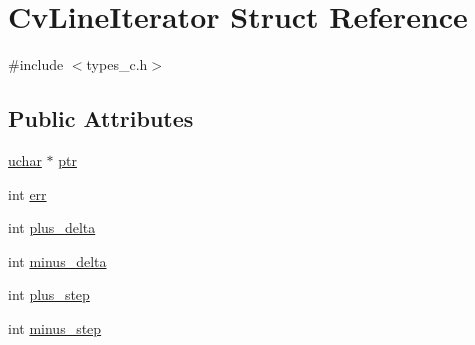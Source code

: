 \hypertarget{structCvLineIterator}{\section{Cv\-Line\-Iterator Struct Reference}
\label{structCvLineIterator}
}


{\ttfamily \#include $<$types\-\_\-c.\-h$>$}

\subsection*{Public Attributes}
\begin{DoxyCompactItemize}
\item 
\hyperlink{core_2types__c_8h_a65f85814a8290f9797005d3b28e7e5fc}{uchar} $\ast$ \hyperlink{structCvLineIterator_a4b9a839ba96ac5483b34bc9d0e62d7bc}{ptr}
\item 
int \hyperlink{structCvLineIterator_afbd0db5ca4d4024982da0795a476beb4}{err}
\item 
int \hyperlink{structCvLineIterator_aa3e0be3d6cc56dc2db7660cf9bab5898}{plus\-\_\-delta}
\item 
int \hyperlink{structCvLineIterator_abec3ffacbce18bfc21fd1e7a48e7f1a4}{minus\-\_\-delta}
\item 
int \hyperlink{structCvLineIterator_aad27256f0a4d268aa22ba8155dff9c5e}{plus\-\_\-step}
\item 
int \hyperlink{structCvLineIterator_a0a4fe83e7e9783a1f0d28c74a39722ce}{minus\-\_\-step}
\end{DoxyCompactItemize}


